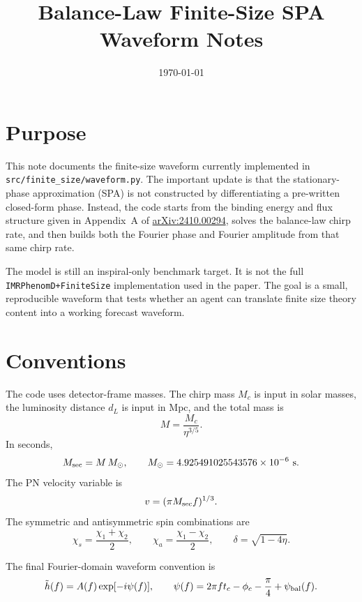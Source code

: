 \documentclass[11pt]{article}
\title{Balance-Law Finite-Size SPA Waveform Notes}
\author{}
\date{\today}
\begin{document}
\maketitle

\section{Purpose}

This note documents the finite-size waveform currently implemented in
\texttt{src/finite\_size/waveform.py}.  The important update is that the
stationary-phase approximation (SPA) is not constructed by differentiating a
pre-written closed-form phase.  Instead, the code starts from the binding
energy and flux structure given in Appendix~A of
\href{https://arxiv.org/abs/2410.00294}{arXiv:2410.00294}, solves the
balance-law chirp rate, and then builds both the Fourier phase and Fourier
amplitude from that same chirp rate.

The model is still an inspiral-only benchmark target.  It is not the full
\texttt{IMRPhenomD+FiniteSize} implementation used in the paper.  The goal is a
small, reproducible waveform that tests whether an agent can translate finite
size theory content into a working forecast waveform.

\section{Conventions}

The code uses detector-frame masses.  The chirp mass \(M_c\) is input in solar
masses, the luminosity distance \(d_L\) is input in Mpc, and the total mass is
\begin{equation}
  M = \frac{M_c}{\eta^{3/5}} .
\end{equation}
In seconds,
\begin{equation}
  M_{\rm sec} = M\,M_\odot,
  \qquad
  M_\odot = 4.925491025543576\times 10^{-6}\ {\rm s}.
\end{equation}
The PN velocity variable is
\begin{equation}
  v = (\pi M_{\rm sec} f)^{1/3}.
\end{equation}
The symmetric and antisymmetric spin combinations are
\begin{equation}
  \chi_s = \frac{\chi_1+\chi_2}{2},
  \qquad
  \chi_a = \frac{\chi_1-\chi_2}{2},
  \qquad
  \delta = \sqrt{1-4\eta}.
\end{equation}

The final Fourier-domain waveform convention is
\begin{equation}
  \tilde h(f) =
  A(f)\exp[-i\psi(f)],
  \qquad
  \psi(f) =
  2\pi f t_c-\phi_c-\frac{\pi}{4}+\psi_{\rm bal}(f).
\end{equation}
\end{document}
